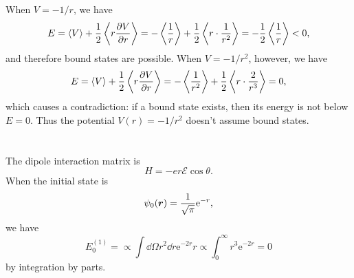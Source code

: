 \documentclass[hyperref, a4paper]{article}
\newcommand*{\ee}{\mathrm{e}}
\begin{document}
When $V = - 1 / r$, we have 
\begin{equation}
    E = \expval{V} + \frac{1}{2} \expval{r \pdv{V}{r}} 
    = - \expval{\frac{1}{r}} + \frac{1}{2} \expval{r \cdot \frac{1}{r^2}}
    = - \frac{1}{2} \expval{\frac{1}{r}} < 0,
\end{equation}
and therefore bound states are possible.
When $V = - 1 / r^2$, however, we have 
\begin{equation}
    E = \expval{V} + \frac{1}{2} \expval{r \pdv{V}{r}} 
    = - \expval{\frac{1}{r^2}} + \frac{1}{2} \expval{r \cdot \frac{2}{r^3}} = 0,
\end{equation} 
which causes a contradiction:
if a bound state exists, then its energy is not below $E = 0$.
Thus the potential $V(r) = - 1 / r^2$ doesn't assume bound states.

\section{}



\section{}

\subsection{}

The dipole interaction matrix is 
\begin{equation}
    H = - e r \mathcal{E} \cos \theta .
\end{equation}
When the initial state is 
\begin{equation}
    \psi_0(\vb*{r}) = \frac{1}{\sqrt{\pi}} \ee^{- r},
\end{equation}
we have 
\begin{equation}
    E_0^{(1)} =  \propto \int \dd{\Omega} r^2 \dd{r} \ee^{- 2 r} r 
    \propto \int_{0}^{\infty} r^3 \ee^{- 2 r} 
    = 0
\end{equation}
by integration by parts.

\subsection{}
\end{document}

